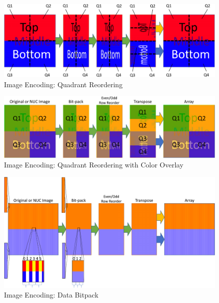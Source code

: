     \begin{figure}
        \centering
        \includegraphics[trim=0in 0in 0in 0in,width=1.0\textwidth]{fig/image_encoding_quads.pdf}
        \caption{Image Encoding: Quadrant Reordering}
        \label{fig:image_encoding_quads}
    \end{figure}

    \begin{figure}
        \centering
        \includegraphics[trim=0in 0in 0in 0in,width=1.0\textwidth]{fig/image_encoding_colored.pdf}
        \caption{Image Encoding: Quadrant Reordering with Color Overlay}
        \label{fig:image_encoding_colored}
    \end{figure}

    \begin{figure}
        \centering
        \includegraphics[trim=0in 0in 0in 0in,width=1.0\textwidth]{fig/image_encoding_bitback.pdf}
        \caption{Image Encoding: Data Bitpack}
        \label{fig:image_encoding_bitback}
    \end{figure}

